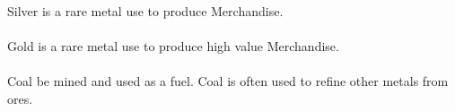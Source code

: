 \Gls*{Silver} is a rare metal use to produce \gls{Merchandise}.

\paragraph{}

\Gls*{Gold} is a rare metal use to produce high value \gls{Merchandise}.

\paragraph{}

\Gls*{Coal} be mined and used as a fuel. \Gls*{Coal} is often used to refine other metals from ores.
